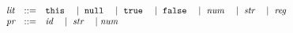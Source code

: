 \documentclass[a4, leqno]{amsart}
\begin{document}
\newcommand{\rewrite}{\ensuremath{\emph{rewrite}}}
\newcommand{\rewriteP}{\ensuremath{\emph{rewrite}_p}}
\newcommand{\rewritePf}[1]{\ensuremath{\rewriteP\lbr#1\rbr}}
\newcommand{\rewriteT}{\ensuremath{\emph{rewrite}_t}}
\newcommand{\rewriteTf}[2]{\ensuremath{\rewriteT\lbr#1\mid#2\rbr}}
\newcommand{\rewriteTfo}[1]{\ensuremath{\rewriteT\lbr#1\mid\emptyenv\rbr}}
\newcommand{\rewriteS}{\ensuremath{\emph{rewrite}_s}}
\newcommand{\rewriteSf}[2]{\ensuremath{\rewriteS\lbr#1\mid#2\rbr}}
\newcommand{\rewriteVD}{\ensuremath{\emph{rewrite}_{vd}}}
\newcommand{\rewriteVDf}[2]{\ensuremath{\rewriteVD\lbr#1\mid#2\rbr}}
\newcommand{\rewriteCC}{\ensuremath{\emph{rewrite}_{cc}}}
\newcommand{\rewriteCCf}[2]{\ensuremath{\rewriteCC\lbr#1\mid#2\rbr}}
\newcommand{\rewriteCT}{\ensuremath{\emph{rewrite}_{ct}}}
\newcommand{\rewriteCTf}[2]{\ensuremath{\rewriteCT\lbr#1\mid#2\rbr}}
\newcommand{\rewriteE}{\ensuremath{\emph{rewrite}_e}}
\newcommand{\rewriteEf}[2]{\ensuremath{\rewriteE\lbr#1\mid#2\rbr}}
\newcommand{\rewriteL}{\ensuremath{\emph{rewrite}_l}}
\newcommand{\rewriteLf}[2]{\ensuremath{\rewriteL\lbr#1\mid#2\rbr}}

\newcommand{\lbr}{\ensuremath{\llbracket}}
\newcommand{\rbr}{\ensuremath{\rrbracket}}
\newcommand{\ospTwo}{\quad\quad\quad\;\;}
\newcommand{\ospThree}{\ospTwo \spOne \quad}

\newcommand{\spSeven}{\quad\;}
\newcommand{\spNine}{\quad\;\;}
\newcommand{\spTen}{\quad\quad}
\newcommand{\spOne}{\quad\quad\;}
 \newcommand{\spEi}{\quad\quad\;\;\;}
\newcommand{\spSix}{\quad\quad\;\;\;\;\;}
\newcommand{\spTwo}{\quad\quad\quad\;}
\newcommand{\spFive}{\quad\quad\quad\quad\;\;}
\newcommand{\spThree}{\quad\quad\quad\quad\quad\;\;\;\;}
 \newcommand{\spFour}{\quad\quad\quad\quad\quad\;\;\;\;\;\;}

\newcommand{\todo}{{\color{blue}{\emph{TODO}}}}


\newif\iftr
\ifx\tr\undefined
  \trfalse
\else
 \trtrue
\fi

\[
\begin{array}{lll}
\lit &::=& {\tt this}
  \quad \mid \ {\tt null}
  \quad \mid \ {\tt true}
  \quad \mid \ {\tt false}
  \quad \mid \ \num
  \quad \mid \ \str
  \quad \mid \ \reg
\spThree\spTwo\spOne
\\

\prop &::=& \myid
  \quad \mid \ \str
  \quad \mid  \num
\end{array}
\]
\end{document}
